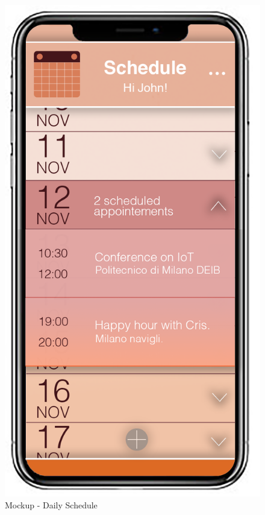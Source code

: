 \begin{figure}[H]	
	\centerline{\includegraphics[width=0.3\paperwidth]{Images/DailySchedule}}
	\caption{Mockup - Daily Schedule}
\end{figure}
